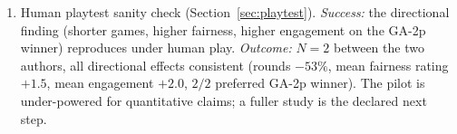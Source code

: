 \documentclass[10pt]{article}
\begin{document}
\begin{enumerate}[leftmargin=1.4em,itemsep=1pt]
converges to a non-trivial design; cross-evaluating it under the
rule-based pool exposes (or fails to expose) the
single-personality blind spot. \emph{Outcome:} the cross-evaluator
fairness gap is $+0.18$ at 2p and $+0.35$ at 3p, widening with
player count. This is the central diagnostic claim of the paper.
\item Human playtest sanity check (Section~\ref{sec:playtest}).
\emph{Success:} the directional finding (shorter games, higher
fairness, higher engagement on the GA-2p winner) reproduces under
human play. \emph{Outcome:} $N{=}2$ between the two authors, all
directional effects consistent (rounds $-53\%$, mean fairness
rating $+1.5$, mean engagement $+2.0$, $2/2$ preferred GA-2p
winner). The pilot is under-powered for quantitative claims; a
fuller study is the declared next step.
\end{enumerate}



\end{document}
